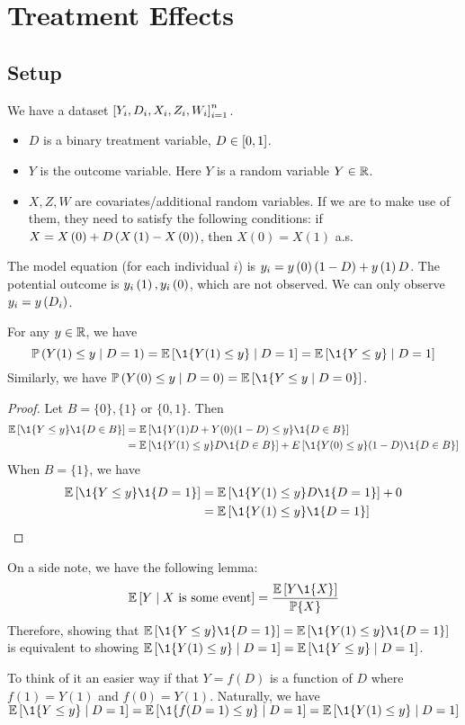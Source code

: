 \section{Treatment Effects}
\subsection{Setup} We have a dataset $\left[Y_i,D_i,X_i,Z_i,W_i\right]_{i=1}^n$.
\begin{itemize}
    \item $D$ is a binary treatment variable, $D\in\left[0,1\right]$.
    \item $Y$ is the outcome variable. Here $Y$ is a random variable $Y\in \mathbb{R}$.
    \item $X,Z,W$ are covariates/additional random variables. If we are to make use of them, they need to satisfy the following conditions: if $X=X\left(0\right)+D\left(X\left(1\right)-X\left(0\right)\right)$, then $X(0)=X(1)$ a.s.
\end{itemize}
The model equation (for each individual $i$) is $y_i=y\left(0\right)(1-D)+y\left(1\right)D$. The potential outcome is $y_i\left(1\right),y_i\left(0\right)$, which are not observed. We can only observe $y_i=y\left(D_i\right)$.
\begin{proposition}
    For any $y\in \mathbb{R}$, we have
    \begin{equation*}
        \p\pa{Y(1)\le y \mid D=1} =\E\bra{\1\{Y(1)\le y\}\mid D=1}=\E\bra{\1\{Y\le y\}\mid D=1}
    \end{equation*}
    Similarly, we have $\p\pa{Y(0)\le y \mid D=0} =\E\bra{\1\{Y\le y\mid D=0\}}$.
\end{proposition}
\begin{proof}
    Let $B=\{0\},\{1\}$ or $\{0,1\}$. Then
    \begin{align*}
        \E\bra{\1\{Y\le y\}\1\{D\in B\}} & = \E\bra{\1\{Y(1)D+Y(0)(1-D)\le y\}\1\{D\in B\}}                               \\
                                         & = \E\bra{\1\{Y(1)\le y\}D\1\{D\in B\}}+E\bra{\1\{Y(0)\le y\}(1-D)\1\{D\in B\}}
    \end{align*}
    When $B=\{1\}$, we have
    \begin{align*}
        \E\bra{\1\{Y\le y\}\1\{D=1\}} & = \E\bra{\1\{Y(1)\le y\}D\1\{D=1\}}  +0 \\
                                      & = \E\bra{\1\{Y(1)\le y\}\1\{D=1\}}
    \end{align*}
\end{proof}

On a side note, we have the following lemma:
\begin{equation*}
    \E\bra{Y \mid X\ \text{is some event}}=\frac{\E\bra{Y\1\{X\}}}{\p\{X\}}
\end{equation*}
Therefore, showing that $\E\bra{\1\{Y\le y\}\1\{D=1\}}=\E\bra{\1\{Y(1)\le y\}\1\{D=1\}}$ is equivalent to showing $\E\bra{\1\{Y(1)\le y\}\mid D=1}=\E\bra{\1\{Y\le y\}\mid D=1}$.
\begin{remark}
    To think of it an easier way if that $Y=f(D)$ is a function of $D$ where $f(1)=Y(1)$ and $f(0)=Y(1)$. Naturally, we have $\E\bra{\1\{Y\le y\}\mid D=1}=\E\bra{\1\{f(D=1)\le y\}\mid D=1}=\E\bra{\1\{Y(1)\le y\}\mid D=1}$
\end{remark}

